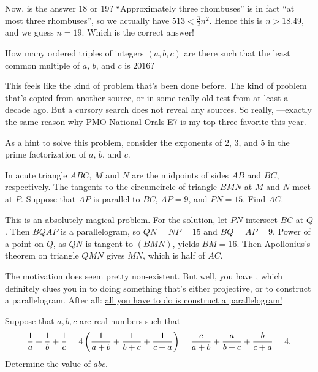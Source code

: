 \documentclass[11pt,paper=letter]{scrartcl}
\begin{document}
Now, is the answer $18$ or $19$? ``Approximately three rhombuses'' is in fact ``at most three rhombuses'', so we actually have $513 < \frac32n^2$. Hence this is $n > 18.49$, and we guess $n = 19$. Which is the correct answer!

\begin{probboxed}
   How many ordered triples of integers $(a, b, c)$ are there such that the least common multiple of $a$, $b$, and $c$ is $2016$?
\end{probboxed}

This feels like the kind of problem that's been done before. The kind of problem that's copied from another source, or in some really old test from at least a decade ago. But a cursory search does not reveal any sources. So really, ---exactly the same reason why PMO National Orals E7 is my top three favorite this year.

As a hint to solve this problem, consider the exponents of $2$, $3$, and $5$ in the prime factorization of $a$, $b$, and $c$.

\begin{probboxed}
   In acute triangle $ABC$, $M$ and $N$ are the midpoints of sides $AB$ and $BC$, respectively. The tangents to the circumcircle of triangle $BMN$ at $M$ and $N$ meet at $P$. Suppose that $AP$ is parallel to $BC$, $AP = 9$, and $PN = 15$. Find $AC$.
\end{probboxed}

This is an absolutely magical problem. For the solution, let $PN$ intersect $BC$ at $Q$. Then $BQAP$ is a parallelogram, so $QN = NP = 15$ and $BQ = AP = 9$. Power of a point on $Q$, as $QN$ is tangent to $(BMN)$, yields $BM = 16$. Then Apollonius's theorem on triangle $QMN$ gives $MN$, which is half of $AC$. 

The motivation does seem pretty non-existent. But well, you have , which definitely clues you in to doing something that's either projective, or to construct a parallelogram. After all: \href{http://web.evanchen.cc/handouts/BMC_Parallelograms/BMC_Parallelograms.pdf}{all you have to do is construct a parallelogram!}

\begin{probboxed}
   Suppose that $a, b, c$ are real numbers such that $$\frac1a + \frac1b + \frac1c = 4\left( \frac1{a+b} + \frac1{b+c} + \frac1{c+a} \right) = \frac c{a+b} + \frac a{b+c} + \frac b{c+a} = 4.$$ Determine the value of $abc$.
\end{probboxed}
\end{document}
